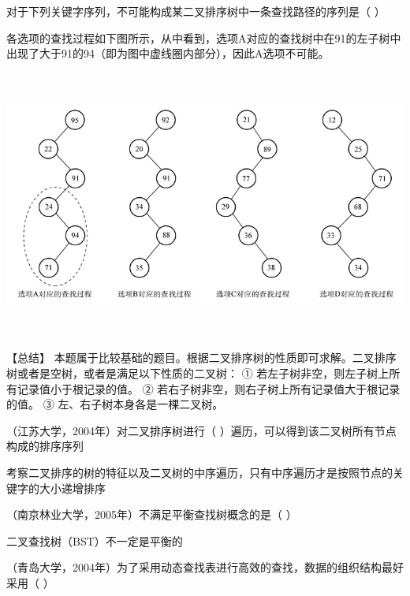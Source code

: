 \question 对于下列关键字序列，不可能构成某二叉排序树中一条查找路径的序列是（ ）
\par{}
\begin{solution}各选项的查找过程如下图所示，从中看到，选项A对应的查找树中在91的左子树中出现了大于91的94（即为图中虚线圈内部分），因此A选项不可能。
\includegraphics[width=7.58333in,height=3.77083in]{computerassets/0541e42c6cfafd6de4847b09c02eae6e.jpeg}
【总结】
本题属于比较基础的题目。根据二叉排序树的性质即可求解。二叉排序树或者是空树，或者是满足以下性质的二叉树：
① 若左子树非空，则左子树上所有记录值小于根记录的值。 ②
若右子树非空，则右子树上所有记录值大于根记录的值。 ③
左、右子树本身各是一棵二叉树。
\end{solution}
\question （江苏大学，2004年）对二叉排序树进行（
）遍历，可以得到该二叉树所有节点构成的排序序列
\par{}
\begin{solution}考察二叉排序的树的特征以及二叉树的中序遍历，只有中序遍历才是按照节点的关键字的大小递增排序
\end{solution}
\question （南京林业大学，2005年）不满足平衡查找树概念的是（ ）
\par{}
\begin{solution}二叉查找树（BST）不一定是平衡的
\end{solution}
\question （青岛大学，2004年）为了采用动态查找表进行高效的查找，数据的组织结构最好采用（
）
\par{}

